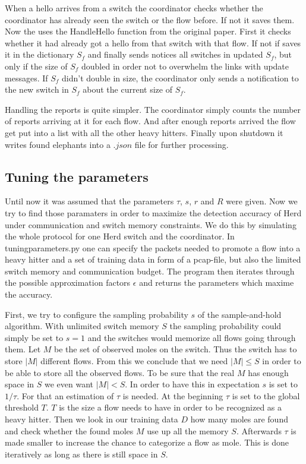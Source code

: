 \documentclass[11pt,oneside,a4paper]{article}
\begin{document}
When a hello arrives from a switch the coordinator checks whether the coordinator has already seen the switch or the flow before. If not it saves them. Now the uses the HandleHello function from the original paper. First it checks whether it had already got a hello from that switch with that flow. If not if saves it in the dictionary $S_f$ and finally sends notices all switches in updated $S_f$, but only if the size of $S_f$ doubled in order not to overwhelm the links with update messages. If $S_f$ didn't double in size, the coordinator only sends a notification to the new switch in $S_f$ about the current size of $S_f$.

Handling the reports is quite simpler. The coordinator simply counts the number of reports arriving at it for each flow. And after enough reports arrived the flow get put into a list with all the other heavy hitters. Finally upon shutdown it writes found elephants into a $.json$ file for further processing.

\subsection{Tuning the parameters} \label{tuningparameters}
Until now it was assumed that the parameters $\tau$, $s$, $r$ and $R$ were given. Now we try to find those paramaters in order to maximize the detection accuracy of Herd under communication and switch memory constraints. We do this by simulating the whole protocol for one Herd switch and the coordinator. In tuningparameters.py one can specify the packets needed to promote a flow into a heavy hitter and a set of training data in form of a pcap-file, but also the limited switch memory and communication budget. The program then iterates through the possible approximation factors $\epsilon$ and returns the parameters which maxime the accuracy.

First, we try to configure the sampling probability $s$ of the sample-and-hold algorithm. With unlimited switch memory $S$ the sampling probability could simply be set to $s=1$ and the switches would memorize all flows going through them. Let $M$ be the set of observed moles on the switch. Thus the switch has to store $|M|$ different flows. From this we conclude that we need $|M| \leq S$ in order to be able to store all the observed flows. To be sure that the real $M$ has enough space in $S$ we even want $|M| < S$. In order to have this in expectation $s$ is set to $1/\tau$. For that an estimation of $\tau$ is needed. At the beginning $\tau$ is set to the global threshold $T$. $T$ is the size a flow needs to have in order to be recognized as a heavy hitter. Then we look in our training data $D$ how many moles are found and check whether the found moles $M$ use up all the memory $S$. Afterwards $\tau$ is made smaller to increase the chance to categorize a flow as mole. This is done iteratively as long as there is still space in $S$. 
\end{document}

